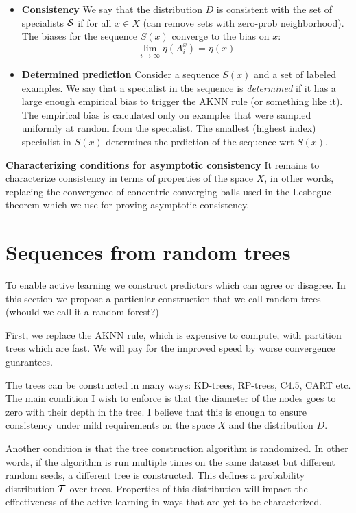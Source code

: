 \documentclass{article}
\begin{document}
\begin{itemize}
\item {\bf Consistency} We say that the distribution $D$ is consistent
  with the set of specialists ${\cal S}$ if for all $x \in X$ (can
  remove sets with zero-prob neighborhood). The biases for the
  sequence $S(x)$ converge to the bias on $x$:
  \[
    \lim_{i \to \infty} \eta(A_i^x) = \eta(x)
  \]
\item {\bf Determined prediction} Consider a sequence $S(x)$ and a set of
  labeled examples. We say that a specialist in the sequence is {\em
    determined} if it has a large enough empirical bias to trigger the
  AKNN rule (or something like it). The empirical bias is calculated
  only on examples that were sampled uniformly at random from the
  specialist. The smallest (highest index) specialist in $S(x)$
  determines the prdiction of the sequence wrt $S(x)$.
  
\end{itemize}


{\bf Characterizing conditions for asymptotic consistency}
It remains to characterize consistency in terms of properties of the
space $X$, in other words, replacing the convergence of concentric
converging balls used in the Lesbegue theorem which we use for proving
asymptotic consistency.

\section{Sequences from random trees}
\newcommand{\T}{{\cal T}}

To enable active learning we construct predictors which can agree or
disagree. In this section we propose a particular construction that we
call random trees (whould we call it a random forest?)

First, we replace the AKNN rule, which is expensive to compute, with
partition trees which are fast. We will pay for the improved speed by worse
convergence guarantees.

The trees can be constructed in many ways: KD-trees, RP-trees, C4.5,
CART etc. The main condition I wish to enforce is that the
diameter of the nodes goes to zero with their depth in the tree. I
believe that this is enough to ensure consistency under mild
requirements on the space $X$ and the distribution $D$.

Another condition is that the tree construction algorithm is
randomized. In other words, if the algorithm is run multiple times on
the same dataset but different random seeds, a different tree is
constructed. This defines a probability distribution $\T$ over
trees. Properties of this distribution will impact the effectiveness
of the active learning in ways that are yet to be characterized.
\end{document}
